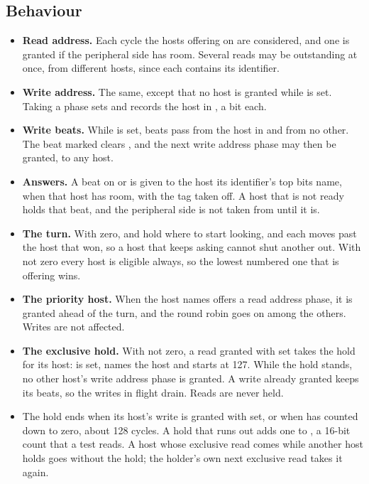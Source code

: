 \subsection*{Behaviour}

\begin{itemize}
\item \textbf{Read address.} Each cycle the hosts offering on
 are considered, and one is granted if the peripheral side
has room. Several reads may be outstanding at once, from different
hosts, since each contains its identifier.
\item \textbf{Write address.} The same, except that no host is granted
while  is set. Taking a phase sets  and
records the host in , a bit each.
\item \textbf{Write beats.} While  is set, beats pass from
the host in  and from no other. The beat marked 
clears , and the next write address phase may then be
granted, to any host.
\item \textbf{Answers.} A beat on  or  is given to the
host its identifier's top bits name, when that host has room, with the
tag taken off. A host that is not ready holds that beat, and the
peripheral side is not taken from until it is.
\item \textbf{The turn.} With  zero,  and
 hold where to start looking, and each moves past the host
that won, so a host that keeps asking cannot shut another out. With
 not zero every host is eligible always, so the lowest
numbered one that is offering wins.
\item \textbf{The priority host.} When the host  names offers
a read address phase, it is granted ahead of the turn, and the round
robin goes on among the others. Writes are not affected.
\item \textbf{The exclusive hold.} With  not zero, a read
granted with  set takes the hold for its host:
 is set,  names the host and 
starts at 127. While the hold stands, no other host's write address
phase is granted. A write already granted keeps its beats, so the
writes in flight drain. Reads are never held.
\item The hold ends when its host's write is granted with
 set, or when  has counted down to zero, about
128 cycles. A hold that runs out adds one to , a
16-bit count that a test reads. A host whose exclusive read comes
while another host holds goes without the hold; the holder's own next
exclusive read takes it again.
\end{itemize}

